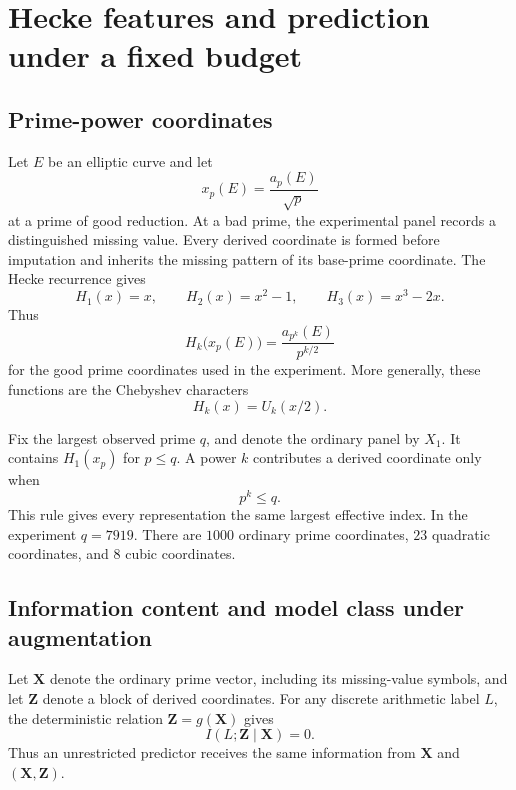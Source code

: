 \documentclass[12pt,reqno]{amsart}
\numberwithin{equation}{section}
\theoremstyle{plain}
\theoremstyle{definition}
\theoremstyle{remark}
\begin{document}
\section{Hecke features and prediction under a fixed budget}
\label{secFeatures}

\subsection{Prime-power coordinates}

Let $E$ be an elliptic curve and let
\begin{equation*}
x_p(E)=\frac{a_p(E)}{\sqrt p}
\end{equation*}
at a prime of good reduction.  At a bad prime, the experimental panel records a distinguished missing value.  Every derived coordinate is formed before imputation and inherits the missing pattern of its base-prime coordinate.
The Hecke recurrence gives
\begin{equation*}
H_1(x)=x,\qquad
H_2(x)=x^2-1,\qquad
H_3(x)=x^3-2x.
\end{equation*}
Thus
\begin{equation*}
H_k\bigl(x_p(E)\bigr)
=
\frac{a_{p^k}(E)}{p^{k/2}}
\end{equation*}
for the good prime coordinates used in the experiment.  More generally, these functions are the Chebyshev characters
\begin{equation*}
H_k(x)=U_k(x/2).
\end{equation*}

Fix the largest observed prime $q$, and denote the ordinary panel by $X_1$.
It contains $H_1(x_p)$ for $p\leq q$.
A power $k$ contributes a derived coordinate only when
\begin{equation*}
p^k\leq q.
\end{equation*}
This rule gives every representation the same largest effective index.
In the experiment $q=7919$.
There are $1000$ ordinary prime coordinates, $23$ quadratic coordinates, and $8$ cubic coordinates.

\subsection{Information content and model class under augmentation}

Let $\mathbf X$ denote the ordinary prime vector, including its missing-value symbols, and let $\mathbf Z$ denote a block of derived coordinates.
For any discrete arithmetic label $L$, the deterministic relation $\mathbf Z=g(\mathbf X)$ gives
\begin{equation*}
I(L;\mathbf Z\mid\mathbf X)=0.
\end{equation*}
Thus an unrestricted predictor receives the same information from $\mathbf X$ and $(\mathbf X,\mathbf Z)$.
\end{document}
